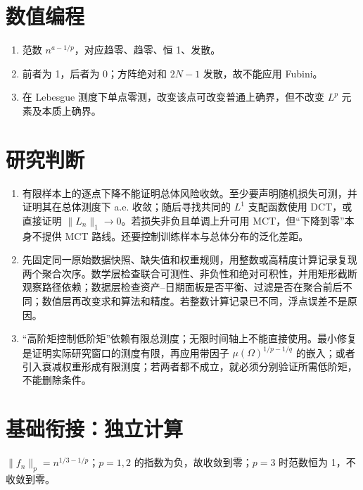 \section*{数值编程}
\begin{enumerate}[leftmargin=*]
  \item 范数 $n^{a-1/p}$，对应趋零、趋零、恒 1、发散。
  \item 前者为 1，后者为 0；方阵绝对和 $2N-1$ 发散，故不能应用 Fubini。
  \item 在 Lebesgue 测度下单点零测，改变该点可改变普通上确界，但不改变 $L^p$ 元素及本质上确界。
\end{enumerate}

\section*{研究判断}

\begin{enumerate}[leftmargin=*]
  \item 有限样本上的逐点下降不能证明总体风险收敛。至少要声明随机损失可测，并证明其在总体测度下 a.e. 收敛；随后寻找共同的 $L^1$ 支配函数使用 DCT，或直接证明 $\lVert L_n\rVert_1\to0$。若损失非负且单调上升可用 MCT，但“下降到零”本身不提供 MCT 路线。还要控制训练样本与总体分布的泛化差距。
  \item 先固定同一原始数据快照、缺失值和权重规则，用整数或高精度计算记录复现两个聚合次序。数学层检查联合可测性、非负性和绝对可积性，并用矩形截断观察路径依赖；数据层检查资产--日期面板是否平衡、过滤是否在聚合前后不同；数值层再改变求和算法和精度。若整数计算记录已不同，浮点误差不是原因。
  \item “高阶矩控制低阶矩”依赖有限总测度；无限时间轴上不能直接使用。最小修复是证明实际研究窗口的测度有限，再应用带因子 $\mu(\Omega)^{1/p-1/q}$ 的嵌入；或者引入衰减权重形成有限测度；若两者都不成立，就必须分别验证所需低阶矩，不能删除条件。
\end{enumerate}

\section*{基础衔接：独立计算}
$\|f_n\|_p=n^{1/3-1/p}$；$p=1,2$ 的指数为负，故收敛到零；$p=3$ 时范数恒为 1，不收敛到零。
